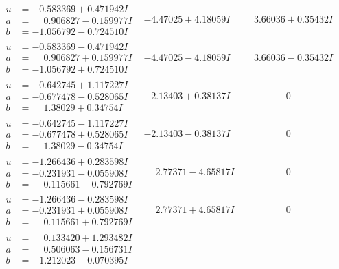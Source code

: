 \documentclass[1p]{elsarticle_modified}
\theoremstyle{definition}
\begin{document}
$$\begin{array}{c|c|c}
 \hline 
\begin{aligned}
u &= -0.583369 + 0.471942 I \\
a &= \phantom{-}0.906827 - 0.159977 I \\
b &= -1.056792 - 0.724510 I\end{aligned}
 & -4.47025 + 4.18059 I & \phantom{-}3.66036 + 0.35432 I \\ \hline\begin{aligned}
u &= -0.583369 - 0.471942 I \\
a &= \phantom{-}0.906827 + 0.159977 I \\
b &= -1.056792 + 0.724510 I\end{aligned}
 & -4.47025 - 4.18059 I & \phantom{-}3.66036 - 0.35432 I \\ \hline\begin{aligned}
u &= -0.642745 + 1.117227 I \\
a &= -0.677478 - 0.528065 I \\
b &= \phantom{-}1.38029 + 0.34754 I\end{aligned}
 & -2.13403 + 0.38137 I & \phantom{-0.000000 } 0 \\ \hline\begin{aligned}
u &= -0.642745 - 1.117227 I \\
a &= -0.677478 + 0.528065 I \\
b &= \phantom{-}1.38029 - 0.34754 I\end{aligned}
 & -2.13403 - 0.38137 I & \phantom{-0.000000 } 0 \\ \hline\begin{aligned}
u &= -1.266436 + 0.283598 I \\
a &= -0.231931 - 0.055908 I \\
b &= \phantom{-}0.115661 - 0.792769 I\end{aligned}
 & \phantom{-}2.77371 - 4.65817 I & \phantom{-0.000000 } 0 \\ \hline\begin{aligned}
u &= -1.266436 - 0.283598 I \\
a &= -0.231931 + 0.055908 I \\
b &= \phantom{-}0.115661 + 0.792769 I\end{aligned}
 & \phantom{-}2.77371 + 4.65817 I & \phantom{-0.000000 } 0 \\ \hline\begin{aligned}
u &= \phantom{-}0.133420 + 1.293482 I \\
a &= \phantom{-}0.506063 - 0.156731 I \\
b &= -1.212023 - 0.070395 I\end{aligned}

\end{array}$$
\end{document}

